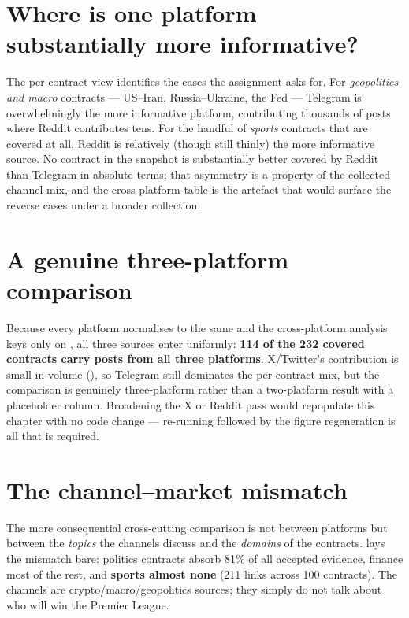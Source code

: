 \section{Where is one platform substantially more informative?}
The per-contract view identifies the cases the assignment asks for. For
\emph{geopolitics and macro} contracts --- US--Iran, Russia--Ukraine, the Fed --- Telegram
is overwhelmingly the more informative platform, contributing thousands of posts where
Reddit contributes tens. For the handful of \emph{sports} contracts that are covered at
all, Reddit is relatively (though still thinly) the more informative source. No contract
in the snapshot is substantially better covered by Reddit than Telegram in absolute
terms; that asymmetry is a property of the collected channel mix, and the cross-platform
table is the artefact that would surface the reverse cases under a broader collection.

\section{A genuine three-platform comparison}
Because every platform normalises to the same  and the
cross-platform analysis keys only on , all three sources enter
 uniformly: \textbf{114 of the 232 covered contracts carry
posts from all three platforms}. X/Twitter's contribution is small in volume
(), so Telegram still dominates the per-contract mix, but the comparison
is genuinely three-platform rather than a two-platform result with a placeholder column.
Broadening the X or Reddit pass would repopulate this chapter with no code change ---
re-running  followed by the figure regeneration is all
that is required.

\section{The channel--market mismatch}
\label{sec:xplat-mismatch}
The more consequential cross-cutting comparison is not between platforms but between
the \emph{topics} the channels discuss and the \emph{domains} of the contracts.
 lays the mismatch bare: politics contracts absorb 81\% of all
accepted evidence, finance most of the rest, and \textbf{sports almost none} (211 links
across 100 contracts). The channels are crypto/macro/geopolitics sources; they simply do
not talk about who will win the Premier League.

